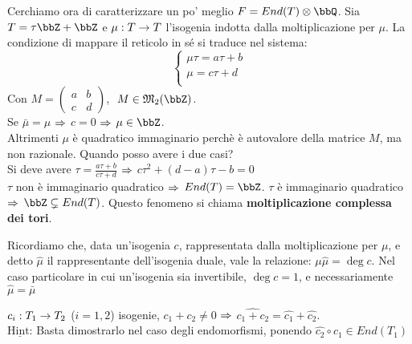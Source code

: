 \noindent Cerchiamo ora di caratterizzare un po' meglio $F=End(T) \otimes \bbQ$. Sia $T=\tau \bbZ + \bbZ$ e $\mu : T \rightarrow T$ l'isogenia indotta dalla moltiplicazione per $\mu$. La condizione di mappare il reticolo in sé si traduce nel sistema:
\begin{equation*}
\begin{cases}
	\mu \tau = a\tau + b\\
	\mu = c\tau + d\\
\end{cases}
\end{equation*}
Con $M=
\begin{pmatrix}
a & b \\
c & d
\end{pmatrix}$, $ \ M\in \mathfrak{M}_{2}(\bbZ)$.\\
Se $\bar{\mu}=\mu$ $\Rightarrow$ $c=0$ $\Rightarrow$ $\mu \in \bbZ$.\\
Altrimenti $\mu$ è quadratico immaginario perchè è autovalore della matrice $M$, ma non razionale.
Quando posso avere i due casi?\\
Si deve avere $\tau = \frac{a\tau + b}{c\tau + d}$ $\Rightarrow$ $c\tau^{2} + (d-a)\tau - b=0$\\
$\tau$ non è immaginario quadratico $\Rightarrow$ $End(T)=\bbZ$.
$\tau$ è immaginario quadratico $\Rightarrow$ $\bbZ \subsetneq End(T)$. Questo fenomeno si chiama {\bf moltiplicazione complessa dei tori}.

Ricordiamo che, data un'isogenia $c$, rappresentata dalla moltiplicazione per $\mu$, e detto $\hat\mu$ il rappresentante dell'isogenia duale, vale la relazione: $\mu \hat\mu = \deg c$. Nel caso particolare in cui un'isogenia sia invertibile, $\deg c = 1$, e necessariamente $\hat\mu = \bar\mu$

 $c_{i}: T_{1} \rightarrow T_{2}$ ($i=1 , 2$) isogenie, $c_{1}+c_{2} \neq 0$ $\Rightarrow$ $\hat{c_{1} + c_{2}}=\hat{c_{1}}+\hat{c_{2}}$.\\
{\bf $\underline{\mbox{Hint:}}$} Basta dimostrarlo nel caso degli endomorfismi, ponendo $\hat{c_{2}}\circ c_{1} \in End(T_{1})$

